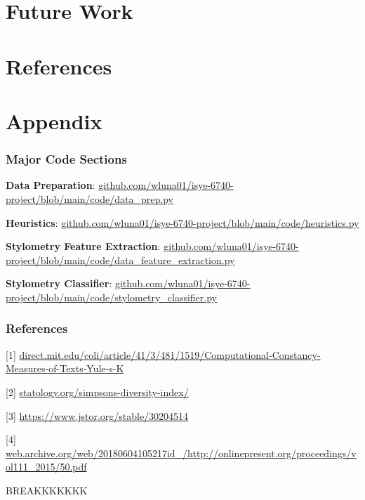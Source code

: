 \documentclass{article}
\begin{document}
\begin{titlepage}
\section{Future Work}

\section{References}

\section{Appendix}
\subsubsection{Major Code Sections}
\textbf{Data Preparation}: \url{github.com/wluna01/isye-6740-project/blob/main/code/data_prep.py}

\textbf{Heuristics}: \url{github.com/wluna01/isye-6740-project/blob/main/code/heuristics.py}

\textbf{Stylometry Feature Extraction}: \url{github.com/wluna01/isye-6740-project/blob/main/code/data_feature_extraction.py}

\textbf{Stylometry Classifier}: \url{github.com/wluna01/isye-6740-project/blob/main/code/stylometry_classifier.py}

\subsubsection{References}
[1] \url{direct.mit.edu/coli/article/41/3/481/1519/Computational-Constancy-Measures-of-Texts-Yule-s-K}

[2] \url{statology.org/simpsons-diversity-index/}

[3] \url{https://www.jstor.org/stable/30204514}

[4] \url{web.archive.org/web/20180604105217id_/http://onlinepresent.org/proceedings/vol111_2015/50.pdf}

BREAKKKKKKK





\end{titlepage}
\end{document}

